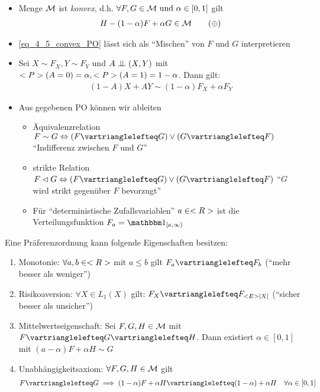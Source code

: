 \begin{*remark}
	\begin{itemize}
		\item Menge $\MM$ ist \emph{konvex}, d.h. $\forall F,G \in \MM  \und \alpha \in [0,1]$ gilt
		\begin{align*}
			H - (1-\alpha)F + \alpha G \in \MM \tag{$\oplus$}\label{eq_4_5_convex_PO}
		\end{align*}
		\item \eqref{eq_4_5_convex_PO} lässt sich als ``Mischen'' von $F$ und $G$ interpretieren
		\item Sei $X \sim F_X, Y \sim F_Y$ und $A \upmodels (X,Y)$ mit $\P(A=0) = \alpha, \P(A=1) = 1-\alpha$. Dann gilt:
		\begin{align*}
			(1-A)X + A Y \sim (1-\alpha)F_X + \alpha F_Y
		\end{align*}
		\item Aus gegebenen PO können wir ableiten
		\begin{itemize}
			\item Äquivalenzrelation $F\sim G \Leftrightarrow (F \vartrianglelefteq G)\vee (G \vartrianglelefteq F)$ ``Indifferenz zwischen $F$ und $G$''
			\item strikte Relation $F \lhd G \Leftrightarrow (F \vartrianglelefteq G)\vee (G \vartrianglelefteq F)$ ``$G$ wird strikt gegenüber $F$ bevorzugt''
			\item Für ``deterministische Zufallsvariablen'' $a \in \R$ ist die Verteilungsfunktion $F_a = \indi_{[a, \infty)}$
		\end{itemize}
	\end{itemize}
\end{*remark}
Eine Präferenzordnung kann folgende Eigenschaften besitzen:
\begin{enumerate}
	\item Monotonie: $\forall a,b \in \R$ mit $a\le b$ gilt $F_a \vartrianglelefteq F_b$ (``mehr besser als weniger'')
	\item Risikoaversion: $\forall X \in L_1(X)$ gilt: $F_X \vartrianglelefteq F_{\E[X]}$ (``sicher besser als unsicher'')
	\item Mittelwertseigenschaft: Sei $F,G,H \in \MM$ mit $F \vartrianglelefteq G \vartrianglelefteq H$. Dann existiert $\alpha \in [0,1]$ mit $(a-\alpha)F + \alpha H \sim G$
	\item Unabhängigkeitsaxiom: $\forall F,G,H \in \MM$ gilt
	\begin{align*}
		F \vartrianglelefteq G \implies (1-\alpha)F + \alpha H \vartrianglelefteq (1-\alpha) + \alpha H \quad \forall \alpha \in [0,1]
	\end{align*} 
\end{enumerate}
